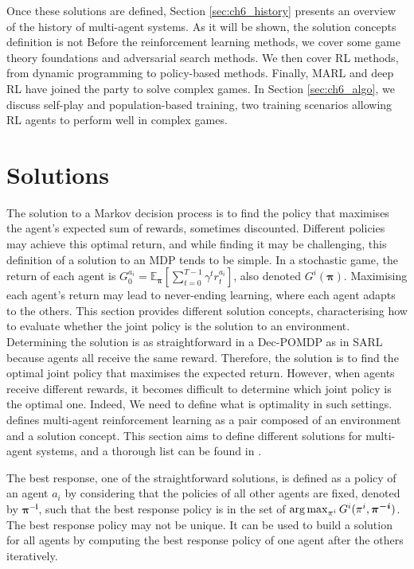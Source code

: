 Once these solutions are defined, Section \ref{sec:ch6_history} presents an overview of the history of multi-agent systems.
As it will be shown, the solution concepts definition is not 
Before the reinforcement learning methods, we cover some game theory foundations and adversarial search methods.
We then cover RL methods, from dynamic programming to policy-based methods.
Finally, MARL and deep RL have joined the party to solve complex games.
In Section \ref{sec:ch6_algo}, we discuss self-play and population-based training, two training scenarios allowing RL agents to perform well in complex games.


\section{Solutions}\label{sec:ch6_solutions}
The solution to a Markov decision process is to find the policy that maximises the agent's expected sum of rewards, sometimes discounted.
Different policies may achieve this optimal return, and while finding it may be challenging, this definition of a solution to an MDP tends to be simple.
In a stochastic game, the return of each agent is $G_0^{a_i} = \mathbb{E}_{\mathbf{\pi}}\left[ \sum_{t=0}^{T-1} \gamma^t r^{a_i}_t \right]$, also denoted $G^i(\mathbf{\pi})$.
Maximising each agent's return may lead to never-ending learning, where each agent adapts to the others.
This section provides different solution concepts, characterising how to evaluate whether the joint policy is the solution to an environment.
Determining the solution is as straightforward in a Dec-POMDP as in SARL because agents all receive the same reward.
Therefore, the solution is to find the optimal joint policy that maximises the expected return.
However, when agents receive different rewards, it becomes difficult to determine which joint policy is the optimal one.
Indeed,
We need to define what is optimality in such settings.
\cite{marl-book} defines multi-agent reinforcement learning as a pair composed of an environment and a solution concept.
This section aims to define different solutions for multi-agent systems, and a thorough list can be found in \citep{marl-book}.

The best response, one of the straightforward solutions, is defined as a policy of an agent $a_i$ by considering that the policies of all other agents are fixed, denoted by $\mathbf{\pi^{-i}}$, such that the best response policy is in the set of $\argmax_{\pi^{i}} G^i (\pi^{i}, \mathbf{\pi^{-i}})$.
The best response policy may not be unique.
It can be used to build a solution for all agents by computing the best response policy of one agent after the others iteratively.

